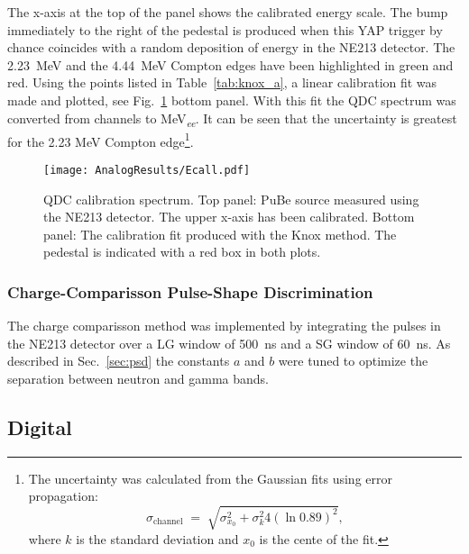 \documentclass[main.tex]{subfiles}
\begin{document}
The x-axis at the top of the panel shows the calibrated energy scale. The bump immediately to the right of the pedestal is produced when this YAP trigger by chance coincides with a random deposition of energy in the NE213 detector. The \SI{2.23}{MeV} and the \SI{4.44}{MeV} Compton edges have been highlighted in green and red. Using the points listed in Table~\ref{tab:knox_a}, a linear calibration fit was made and plotted, see Fig.~\ref{fig:qdc_a} bottom panel. With this fit the QDC spectrum was converted from channels to \si{MeV_{\textit{ee}}}. It can be seen that the uncertainty is greatest for the 2.23 \si{\MeV} Compton edge\footnote{The uncertainty was calculated from the Gaussian fits using error propagation: $$\sigma_\textrm{channel}\;=\;\sqrt{\sigma_{x_0}^2 + \sigma_{k}^2 4\left(\ln0.89\right)^2 },$$ where $k$ is the standard deviation and $x_0$ is the cente of the fit.}.
\begin{figure}[ht!]
    \centering
        \texttt{[image: AnalogResults/Ecall.pdf]}
        \caption[Energy calibration of the analog setup]{QDC calibration spectrum. Top panel: PuBe source measured using the NE213 detector. The upper x-axis has been calibrated. Bottom panel: The calibration fit produced with the Knox method. The pedestal is indicated with a red box in both plots.}
    \label{fig:qdc_a}
\end{figure}

\subsubsection{Charge-Comparisson Pulse-Shape Discrimination}
The charge comparisson method was implemented by integrating the pulses in the NE213 detector over a LG window of \SI{500}{ns} and a SG window of \SI{60}{ns}. As described in Sec.~\ref{sec:psd} the constants $a$ and $b$ were tuned to optimize the separation between neutron and gamma bands.




\subsection{Digital}
\end{document}
